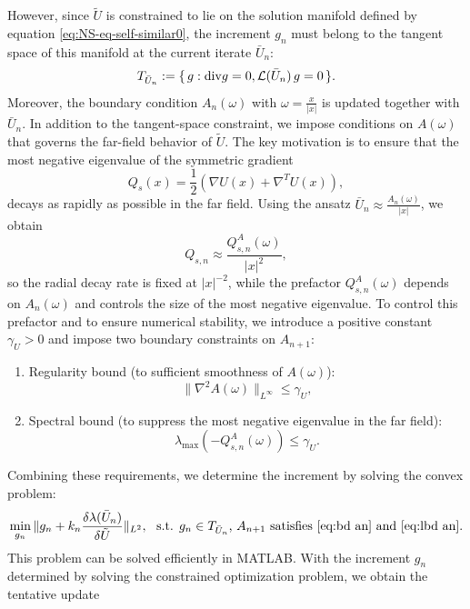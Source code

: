 \documentclass[11pt,a4paper]{article}
\numberwithin{equation}{section}
\newcommand{\assign}{:=}
\begin{document}
However, since $\tilde{U}$ is constrained to lie on the solution manifold
defined by equation \eqref{eq:NS-eq-self-similar0}, the increment $g_n$ must
belong to the tangent space of this manifold at the current iterate
$\bar{U}_n$:
\[ T_{\bar{U}_n} \assign \{ \hspace{0.17em} g : \mathrm{div} g = 0,
   \mathcal{L}(\bar{U}_n) \hspace{0.17em} g = 0 \hspace{0.17em} \} . \]
Moreover, the boundary condition $A_n (\omega)$ with $\omega = \frac{x}{|x|}$
is updated together with $\bar{U}_n$. In addition to the tangent-space
constraint, we impose conditions on $A (\omega)$ that governs the far-field
behavior of $\tilde{U}$. The key motivation is to ensure that the most
negative eigenvalue of the symmetric gradient
\[ Q_s (x) = \frac{1}{2} (\nabla U (x) + \nabla^T U (x)), \]
decays as rapidly as possible in the far field. Using the ansatz $\bar{U}_n
\approx \frac{A_n (\omega)}{| x |}$, we obtain
\[ Q_{s, n} \approx \frac{Q^A_{s, n} (\omega)}{| x |^2}, \]
so the radial decay rate is fixed at $| x |^{- 2}$, while the prefactor $Q_{s,
n}^A (\omega)$ depends on $A_n (\omega)$ and controls the size of the most
negative eigenvalue. To control this prefactor and to ensure numerical
stability, we introduce a positive constant $\gamma_U > 0$ and impose two
boundary constraints on $A_{n + 1}$:
\begin{enumerate}
  \item Regularity bound (to sufficient smoothness of $A (\omega)$):
  \begin{equation}
    \| \nabla^2 A (\omega)\|_{L^\infty} \leqslant \gamma_U, \label{eq:bd an}
  \end{equation}
  \item Spectral bound (to suppress the most negative eigenvalue in the far
  field):
  \begin{equation}
    \lambda_{\max} (- Q_{s, n}^A (\omega)) \leqslant \gamma_U . \label{eq:lbd
    an}
  \end{equation}
\end{enumerate}
Combining these requirements, we determine the increment by solving the convex
problem:
\[ \min_{g_n} \| g_n + k_n \frac{\delta \lambda (\bar{U}_n)}{\delta
   \tilde{U}} \|_{L^2}, \text{ \ s.t. $g_n \in T_{\bar{U}_n}$, $A_{n + 1}$
   satisfies \eqref{eq:bd an} and \eqref{eq:lbd an}.} \]
This problem can be solved efficiently in MATLAB. With the increment $g_n$
determined by solving the constrained optimization problem, we obtain the
tentative update
\end{document}
